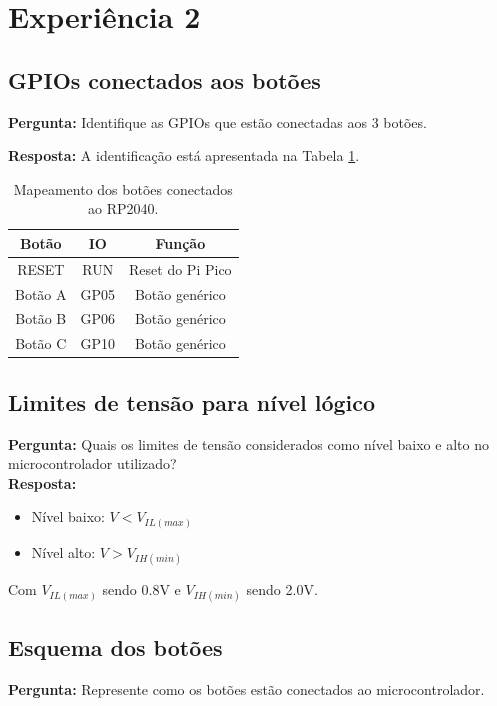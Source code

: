 \documentclass{article}
\begin{document}
\section{Experiência 2}

\subsection{GPIOs conectados aos botões}
\textbf{Pergunta:} Identifique as GPIOs que estão conectadas aos 3 botões.  

\textbf{Resposta:}  
A identificação está apresentada na Tabela \ref{tab:botoes}.  

\begin{table}[H]
    \centering
    \begin{tabular}{ccc}
        \toprule
         Botão & IO   & Função \\
         \midrule
         RESET  & RUN  & Reset do Pi Pico \\
         Botão A & GP05 & Botão genérico \\
         Botão B & GP06 & Botão genérico \\
         Botão C & GP10 & Botão genérico \\
        \bottomrule
    \end{tabular}
    \caption{Mapeamento dos botões conectados ao RP2040.}
    \label{tab:botoes}
\end{table}

\subsection{Limites de tensão para nível lógico}
\textbf{Pergunta:} Quais os limites de tensão considerados como nível baixo e alto no microcontrolador utilizado? \\ 

\textbf{Resposta:}  
\begin{itemize}
    \item Nível baixo: $V < V_{IL(max)}$
    \item Nível alto: $V > V_{IH(min)}$
\end{itemize}

Com $V_{IL(max)}$ sendo 0.8V e $V_{IH(min)}$ sendo 2.0V.

\subsection{Esquema dos botões}
\textbf{Pergunta:} Represente como os botões estão conectados ao microcontrolador.  \\
\end{document}
